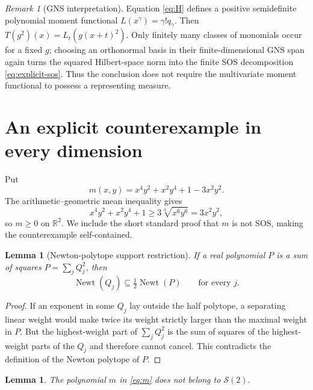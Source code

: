 \documentclass[11pt]{article}
\newtheorem{lemma}[theorem]{Lemma}
\theoremstyle{remark}
\newtheorem{remark}[theorem]{Remark}
\newcommand{\R}{\mathbb R}
\newcommand{\SOS}{\mathcal S}
\begin{document}
\begin{remark}[GNS interpretation]
Equation \eqref{eq:H} defines a positive semidefinite polynomial moment
functional $L(x^\gamma)=\gamma!q_\gamma$.  Then
$T(g^2)(x)=L_t(g(x+t)^2)$.  Only finitely many classes of monomials occur for
a fixed $g$; choosing an orthonormal basis in their finite-dimensional GNS
span again turns the squared Hilbert-space norm into the finite SOS
decomposition \eqref{eq:explicit-sos}.  Thus the conclusion does not require
the multivariate moment functional to possess a representing measure.
\end{remark}

\section{An explicit counterexample in every dimension}

Put
\begin{equation}\label{eq:m}
 m(x,y)=x^4y^2+x^2y^4+1-3x^2y^2.
\end{equation}
The arithmetic--geometric mean inequality gives
\[
 x^4y^2+x^2y^4+1
 \geq3\sqrt[3]{x^6y^6}=3x^2y^2,
\]
so $m\geq0$ on $\R^2$.  We include the short standard proof that $m$ is
not SOS, making the counterexample self-contained.

\begin{lemma}[Newton-polytope support restriction]\label{lem:newton}
If a real polynomial $P$ is a sum of squares $P=\sum_jQ_j^2$, then
\[
 \operatorname{Newt}(Q_j)\subseteq\tfrac12\operatorname{Newt}(P)
 \qquad\text{for every }j.
\]
\end{lemma}

\begin{proof}
If an exponent in some $Q_j$ lay outside the half polytope, a separating
linear weight would make twice its weight strictly larger than the maximal
weight in $P$.  But the highest-weight part of $\sum_jQ_j^2$ is the sum of
squares of the highest-weight parts of the $Q_j$ and therefore cannot cancel.
This contradicts the definition of the Newton polytope of $P$.
\end{proof}

\begin{lemma}\label{lem:motzkin}
The polynomial $m$ in \eqref{eq:m} does not belong to $\SOS(2)$.
\end{lemma}
\end{document}
